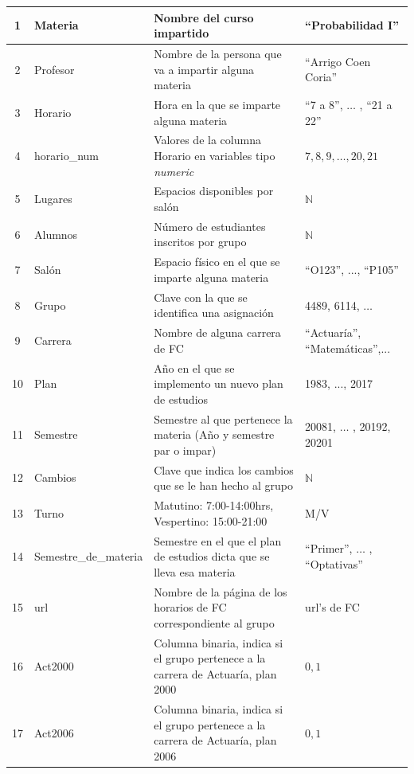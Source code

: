 {\begin{longtable}{|c|l|p{7.5cm}|p{3.5cm}|}
1 & Materia & Nombre del curso impartido & ``Probabilidad I'' \\ 
\hline 
2 & Profesor & Nombre de la persona que va a impartir alguna materia & ``Arrigo Coen Coria'' \\ 
\hline 
3 & Horario & Hora en la que se imparte alguna materia & ``7 a 8'', $\ldots$ , ``21 a 22'' \\ 
\hline
4 & horario\_num & Valores de la columna Horario en variables tipo \textit{numeric} & $7,8,9,\ldots,20,21$ \\ 
\hline
5 & Lugares & Espacios disponibles por salón & $\mathbb{N}$ \\ 
\hline 
6 & Alumnos & Número de estudiantes inscritos por grupo & $\mathbb{N}$ \\ 
\hline 
7 & Salón & Espacio físico en el que se imparte alguna materia & ``O123'', ..., ``P105'' \\ 
\hline 
8 & Grupo & Clave con la que se identifica una asignación & 4489, 6114, $\ldots$ \\ 
\hline 
9 & Carrera & Nombre de alguna carrera de FC & ``Actuaría'', ``Matemáticas'',... \\ 
\hline 
10 & Plan & Año en el que se implemento un nuevo plan de estudios & 1983, ..., 2017 \\ 
\hline 
11 & Semestre & Semestre al que pertenece la materia (Año y semestre par o impar) & 20081, $\ldots$ , 20192, 20201 \\ 
\hline 
12 & Cambios & Clave que indica los cambios que se le han hecho al grupo & $\mathbb{N}$ \\ 
\hline 
13 & Turno & Matutino: 7:00-14:00hrs, Vespertino: 15:00-21:00 & M/V \\ 
\hline 
14 & Semestre\_de\_materia & Semestre en el que el plan de estudios dicta que se lleva esa materia & ``Primer'', $\ldots$ , ``Optativas'' \\ 
\hline 
15 & url & Nombre de la página de los horarios de FC correspondiente al grupo & url's de FC \\ 
\hline 
16 & Act2000 & Columna binaria, indica si el grupo pertenece a la carrera de Actuaría, plan 2000 & $0,1$\\
\hline 
17 & Act2006 & Columna binaria, indica si el grupo pertenece a la carrera de Actuaría, plan 2006 & $0,1$ \\ 

\end{longtable}}
